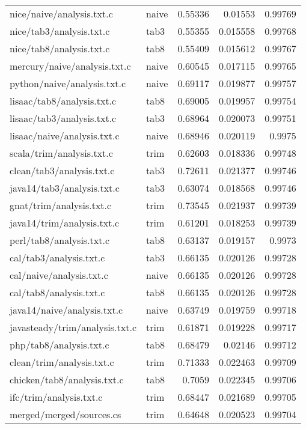 \begin{longtable}{l l r r r}
{nice/naive/analysis.txt.c} & naive & 0.55336 & 0.01553 & 0.99769 \\
{nice/tab3/analysis.txt.c} & tab3 & 0.55355 & 0.015558 & 0.99768 \\
{nice/tab8/analysis.txt.c} & tab8 & 0.55409 & 0.015612 & 0.99767 \\
{mercury/naive/analysis.txt.c} & naive & 0.60545 & 0.017115 & 0.99765 \\
{python/naive/analysis.txt.c} & naive & 0.69117 & 0.019877 & 0.99757 \\
{lisaac/tab8/analysis.txt.c} & tab8 & 0.69005 & 0.019957 & 0.99754 \\
{lisaac/tab3/analysis.txt.c} & tab3 & 0.68964 & 0.020073 & 0.99751 \\
{lisaac/naive/analysis.txt.c} & naive & 0.68946 & 0.020119 & 0.9975 \\
{scala/trim/analysis.txt.c} & trim & 0.62603 & 0.018336 & 0.99748 \\
{clean/tab3/analysis.txt.c} & tab3 & 0.72611 & 0.021377 & 0.99746 \\
{java14/tab3/analysis.txt.c} & tab3 & 0.63074 & 0.018568 & 0.99746 \\
{gnat/trim/analysis.txt.c} & trim & 0.73545 & 0.021937 & 0.99739 \\
{java14/trim/analysis.txt.c} & trim & 0.61201 & 0.018253 & 0.99739 \\
{perl/tab8/analysis.txt.c} & tab8 & 0.63137 & 0.019157 & 0.9973 \\
{cal/tab3/analysis.txt.c} & tab3 & 0.66135 & 0.020126 & 0.99728 \\
{cal/naive/analysis.txt.c} & naive & 0.66135 & 0.020126 & 0.99728 \\
{cal/tab8/analysis.txt.c} & tab8 & 0.66135 & 0.020126 & 0.99728 \\
{java14/naive/analysis.txt.c} & naive & 0.63749 & 0.019759 & 0.99718 \\
{javasteady/trim/analysis.txt.c} & trim & 0.61871 & 0.019228 & 0.99717 \\
{php/tab8/analysis.txt.c} & tab8 & 0.68479 & 0.02146 & 0.99712 \\
{clean/trim/analysis.txt.c} & trim & 0.71333 & 0.022463 & 0.99709 \\
{chicken/tab8/analysis.txt.c} & tab8 & 0.7059 & 0.022345 & 0.99706 \\
{ifc/trim/analysis.txt.c} & trim & 0.68447 & 0.021689 & 0.99705 \\
{merged/merged/sources.cs} & trim & 0.64648 & 0.020523 & 0.99704 \\

\end{longtable}

